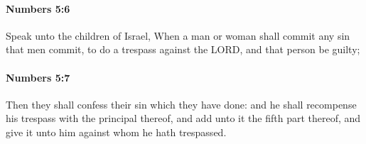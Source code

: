 		\paragraph{Numbers 5:6} %
			\label{NUMBERS-5-6}

			Speak unto the children of Israel, When a man or woman shall commit any sin that men commit, to do a trespass against the LORD, and that person be guilty;


		\paragraph{Numbers 5:7} %
			\label{NUMBERS-5-7}

			Then they shall confess their sin which they have done: and he shall recompense his trespass with the principal thereof, and add unto it the fifth part thereof, and give it unto him against whom he hath trespassed.


